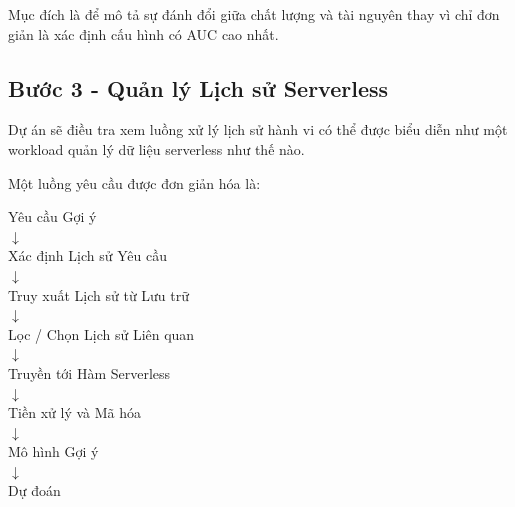 \documentclass[12pt,a4paper]{article}
\begin{document}
\begin{table}[h]
\centering
{}
\end{table}

Mục đích là để mô tả sự đánh đổi giữa chất lượng và tài nguyên thay vì chỉ đơn giản là xác định cấu hình có AUC cao nhất.

\subsection{Bước 3 - Quản lý Lịch sử Serverless}
Dự án sẽ điều tra xem luồng xử lý lịch sử hành vi có thể được biểu diễn như một workload quản lý dữ liệu serverless như thế nào.

Một luồng yêu cầu được đơn giản hóa là:
\begin{center}
Yêu cầu Gợi ý \\
$\downarrow$ \\
Xác định Lịch sử Yêu cầu \\
$\downarrow$ \\
Truy xuất Lịch sử từ Lưu trữ \\
$\downarrow$ \\
Lọc / Chọn Lịch sử Liên quan \\
$\downarrow$ \\
Truyền tới Hàm Serverless \\
$\downarrow$ \\
Tiền xử lý và Mã hóa \\
$\downarrow$ \\
Mô hình Gợi ý \\
$\downarrow$ \\
Dự đoán
\end{center}
\end{document}
